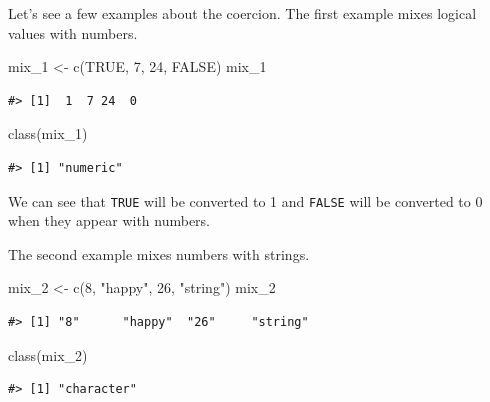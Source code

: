 \documentclass[
]{book}
\newenvironment{Shaded}{\begin{snugshade}}{\end{snugshade}}
\newcommand{\ConstantTok}[1]{\textcolor[rgb]{0.00,0.00,0.00}{#1}}
\newcommand{\DecValTok}[1]{\textcolor[rgb]{0.00,0.00,0.81}{#1}}
\newcommand{\FunctionTok}[1]{\textcolor[rgb]{0.00,0.00,0.00}{#1}}
\newcommand{\NormalTok}[1]{#1}
\newcommand{\OtherTok}[1]{\textcolor[rgb]{0.56,0.35,0.01}{#1}}
\newcommand{\StringTok}[1]{\textcolor[rgb]{0.31,0.60,0.02}{#1}}
\begin{document}
Let's see a few examples about the coercion. The first example mixes logical values with numbers.

\begin{Shaded}
\begin{Highlighting}[]
\NormalTok{mix\_1 }\OtherTok{\textless{}{-}} \FunctionTok{c}\NormalTok{(}\ConstantTok{TRUE}\NormalTok{, }\DecValTok{7}\NormalTok{, }\DecValTok{24}\NormalTok{, }\ConstantTok{FALSE}\NormalTok{)}
\NormalTok{mix\_1 }
\end{Highlighting}
\end{Shaded}

\begin{verbatim}
#> [1]  1  7 24  0
\end{verbatim}

\begin{Shaded}
\begin{Highlighting}[]
\FunctionTok{class}\NormalTok{(mix\_1)}
\end{Highlighting}
\end{Shaded}

\begin{verbatim}
#> [1] "numeric"
\end{verbatim}

We can see that \texttt{TRUE} will be converted to 1 and \texttt{FALSE} will be converted to 0 when they appear with numbers.

The second example mixes numbers with strings.

\begin{Shaded}
\begin{Highlighting}[]
\NormalTok{mix\_2 }\OtherTok{\textless{}{-}} \FunctionTok{c}\NormalTok{(}\DecValTok{8}\NormalTok{, }\StringTok{"happy"}\NormalTok{, }\DecValTok{26}\NormalTok{, }\StringTok{"string"}\NormalTok{)}
\NormalTok{mix\_2 }
\end{Highlighting}
\end{Shaded}

\begin{verbatim}
#> [1] "8"      "happy"  "26"     "string"
\end{verbatim}

\begin{Shaded}
\begin{Highlighting}[]
\FunctionTok{class}\NormalTok{(mix\_2)}
\end{Highlighting}
\end{Shaded}

\begin{verbatim}
#> [1] "character"
\end{verbatim}
\end{document}
